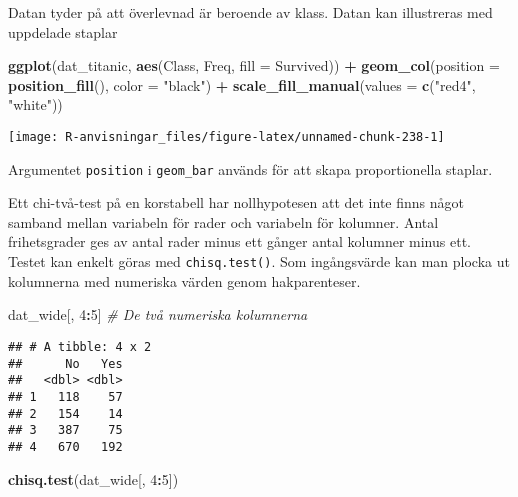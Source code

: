 \documentclass[
]{book}
\newenvironment{Shaded}{\begin{snugshade}}{\end{snugshade}}
\newcommand{\AttributeTok}[1]{\textcolor[rgb]{0.13,0.29,0.53}{#1}}
\newcommand{\CommentTok}[1]{\textcolor[rgb]{0.56,0.35,0.01}{\textit{#1}}}
\newcommand{\DecValTok}[1]{\textcolor[rgb]{0.00,0.00,0.81}{#1}}
\newcommand{\FunctionTok}[1]{\textcolor[rgb]{0.13,0.29,0.53}{\textbf{#1}}}
\newcommand{\NormalTok}[1]{#1}
\newcommand{\SpecialCharTok}[1]{\textcolor[rgb]{0.81,0.36,0.00}{\textbf{#1}}}
\newcommand{\StringTok}[1]{\textcolor[rgb]{0.31,0.60,0.02}{#1}}
\theoremstyle{definition}
\theoremstyle{definition}
\theoremstyle{definition}
\theoremstyle{definition}
\theoremstyle{remark}
\begin{document}
Datan tyder på att överlevnad är beroende av klass. Datan kan illustreras med uppdelade staplar

\begin{Shaded}
\begin{Highlighting}[]
\FunctionTok{ggplot}\NormalTok{(dat\_titanic, }\FunctionTok{aes}\NormalTok{(Class, Freq, }\AttributeTok{fill =}\NormalTok{ Survived)) }\SpecialCharTok{+}
  \FunctionTok{geom\_col}\NormalTok{(}\AttributeTok{position =} \FunctionTok{position\_fill}\NormalTok{(), }\AttributeTok{color =} \StringTok{"black"}\NormalTok{) }\SpecialCharTok{+}
  \FunctionTok{scale\_fill\_manual}\NormalTok{(}\AttributeTok{values =} \FunctionTok{c}\NormalTok{(}\StringTok{"red4"}\NormalTok{, }\StringTok{"white"}\NormalTok{))}
\end{Highlighting}
\end{Shaded}

\begin{center}\texttt{[image: R-anvisningar\_files/figure-latex/unnamed-chunk-238-1]} \end{center}

Argumentet \texttt{position} i \texttt{geom\_bar} används för att skapa proportionella staplar.

Ett chi-två-test på en korstabell har nollhypotesen att det inte finns något samband mellan variabeln för rader och variabeln för kolumner. Antal frihetsgrader ges av antal rader minus ett gånger antal kolumner minus ett. Testet kan enkelt göras med \texttt{chisq.test()}. Som ingångsvärde kan man plocka ut kolumnerna med numeriska värden genom hakparenteser.

\begin{Shaded}
\begin{Highlighting}[]
\NormalTok{dat\_wide[, }\DecValTok{4}\SpecialCharTok{:}\DecValTok{5}\NormalTok{] }\CommentTok{\# De två numeriska kolumnerna}
\end{Highlighting}
\end{Shaded}

\begin{verbatim}
## # A tibble: 4 x 2
##      No   Yes
##   <dbl> <dbl>
## 1   118    57
## 2   154    14
## 3   387    75
## 4   670   192
\end{verbatim}

\begin{Shaded}
\begin{Highlighting}[]
\FunctionTok{chisq.test}\NormalTok{(dat\_wide[, }\DecValTok{4}\SpecialCharTok{:}\DecValTok{5}\NormalTok{])}
\end{Highlighting}
\end{Shaded}
\end{document}
